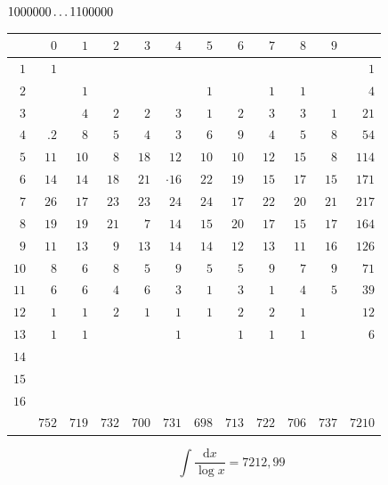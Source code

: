 \clearpage
\noindent\begin{minipage}{\linewidth}\centering
{}
\(1000000\mathinner{.\,.\,.}1100000\)\par\smallskip
\begingroup\fontsize{10.5}{11.5}\selectfont\setlength{\tabcolsep}{3.5pt}\renewcommand{\arraystretch}{1}
\begin{tabular}{r|rrrrrrrrrr|r}\hline
 & $0$ & $1$ & $2$ & $3$ & $4$ & $5$ & $6$ & $7$ & $8$ & $9$ &  \\ \hline
$1$ & $1$ &  &  &  &  &  &  &  &  &  & $1$ \\
$2$ &  & $1$ &  &  &  & $1$ &  & $1$ & $1$ &  & $4$ \\
$3$ &  & $4$ & $2$ & $2$ & $3$ & $1$ & $2$ & $3$ & $3$ & $1$ & $21$ \\
$4$ & $\mathord{.}\!2$ & $8$ & $5$ & $4$ & $3$ & $6$ & $9$ & $4$ & $5$ & $8$ & $54$ \\
$5$ & $11$ & $10$ & $8$ & $18$ & $12$ & $10$ & $10$ & $12$ & $15$ & $8$ & $114$ \\
$6$ & $14$ & $14$ & $18$ & $21$ & $\mathord{\cdot}\!16$ & $22$ & $19$ & $15$ & $17$ & $15$ & $171$ \\
$7$ & $26$ & $17$ & $23$ & $23$ & $24$ & $24$ & $17$ & $22$ & $20$ & $21$ & $217$ \\
$8$ & $19$ & $19$ & $21$ & $7$ & $14$ & $15$ & $20$ & $17$ & $15$ & $17$ & $164$ \\
$9$ & $11$ & $13$ & $9$ & $13$ & $14$ & $14$ & $12$ & $13$ & $11$ & $16$ & $126$ \\
$10$ & $8$ & $6$ & $8$ & $5$ & $9$ & $5$ & $5$ & $9$ & $7$ & $9$ & $71$ \\
$11$ & $6$ & $6$ & $4$ & $6$ & $3$ & $1$ & $3$ & $1$ & $4$ & $5$ & $39$ \\
$12$ & $1$ & $1$ & $2$ & $1$ & $1$ & $1$ & $2$ & $2$ & $1$ &  & $12$ \\
$13$ & $1$ & $1$ &  &  & $1$ &  & $1$ & $1$ & $1$ &  & $6$ \\
$14$ &  &  &  &  &  &  &  &  &  &  &  \\
$15$ &  &  &  &  &  &  &  &  &  &  &  \\
$16$ &  &  &  &  &  &  &  &  &  &  &  \\
\hline
 & $752$ & $719$ & $732$ & $700$ & $731$ & $698$ & $713$ & $722$ & $706$ & $737$ & $7210$ \\ \hline
\end{tabular}\par\endgroup
\setlength{\abovedisplayskip}{6pt}\setlength{\belowdisplayskip}{4pt}
\[\int\frac{\mathrm{d}x}{\log x}=7212{,}99\]
\end{minipage}

